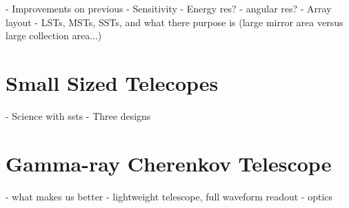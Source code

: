 - Improvements on previous
- Sensitivity
- Energy res?
- angular res?
- Array layout
- LSTs, MSTs, SSTs, and what there purpose is (large mirror area versus large collection area...) 

\section{Small Sized Telecopes}

- Science with ssts
- Three designs

\section{Gamma-ray Cherenkov Telescope}

- what makes us better - lightweight telescope, full waveform readout
- optics








